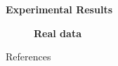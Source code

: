 \documentclass[english,final,t]{beamer}
\begin{document}
\begin{frame}{}
\begin{columns}[t]
\begin{column}{.3\linewidth}
\begin{block}{\textbf{\color{malgared}Experimental Results}}
\begin{figure}[tb]
				\textbf{Real data}
			\end{figure}

			References
			\nocite{*}
			\normalsize
	\end{block}


	\end{column}
\end{columns}
\end{frame}
\end{document}
